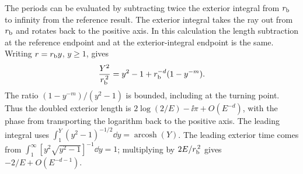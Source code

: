 The periods can be evaluated by subtracting twice the exterior
integral from \(r_{\rm b}\) to infinity from the reference result.
The exterior integral takes the ray out from \(r_{\rm b}\) and rotates
back to the positive axis. In this calculation the length subtraction
at the reference endpoint and at the exterior-integral endpoint
is the same. Writing \(r=r_{\rm b}y\), \(y\geq1\), gives
\begin{equation}
 \frac{Y^2}{r_{\rm b}^{\,2}}
 =y^2-1+r_{\rm b}^{-d}(1-y^{-m}) .
 \label{eq:optical-outer-factor}
\end{equation}
The ratio \((1-y^{-m})/(y^2-1)\) is bounded, including at the
turning point. Thus the doubled exterior length is
\(2\log(2/E)-\ii\pi+O(E^{-d})\), with the phase from transporting
the logarithm back to the positive axis. The leading integral
uses \(\int_1^Y (y^2-1)^{-1/2}\dd y=\operatorname{arcosh}(Y)\).
The leading exterior time comes from
\(\int_1^\infty [y^2\sqrt{y^2-1}]^{-1}\dd y=1\); multiplying by
\(2E/r_{\rm b}^{\,2}\) gives \(-2/E+O(E^{-d-1})\).

